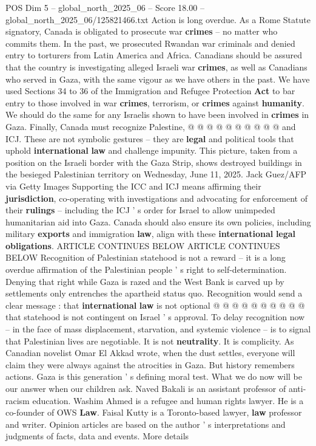 \begin{textsample}{POS Dim 5 – global\_north\_2025\_06 – Score 18.00 – global\_north\_2025\_06/125821466.txt}
Action is long overdue.
As a Rome Statute signatory, Canada is obligated to prosecute war \textbf{crimes} -- no matter who commits them.
In the past, we prosecuted Rwandan war criminals and denied entry to torturers from Latin America and Africa.
Canadians should be assured that the country is investigating alleged Israeli war \textbf{crimes}, as well as Canadians who served in Gaza, with the same vigour as we have others in the past.
We have used Sections 34 to 36 of the Immigration and Refugee Protection \textbf{Act} to bar entry to those involved in war \textbf{crimes}, terrorism, or \textbf{crimes} against \textbf{humanity}.
We should do the same for any Israelis shown to have been involved in \textbf{crimes} in Gaza.
Finally, Canada must recognize Palestine, @ @ @ @ @ @ @ @ @ @ and ICJ.
These are not symbolic gestures -- they are \textbf{legal} and political tools that uphold \textbf{international} \textbf{law} and challenge impunity.
This picture, taken from a position on the Israeli border with the Gaza Strip, shows destroyed buildings in the besieged Palestinian territory on Wednesday, June 11, 2025.
Jack Guez/AFP via Getty Images Supporting the ICC and ICJ means affirming their \textbf{jurisdiction}, co-operating with investigations and advocating for enforcement of their \textbf{rulings} -- including the ICJ ' s order for Israel to allow unimpeded humanitarian aid into Gaza.
Canada should also ensure its own policies, including military \textbf{exports} and immigration \textbf{law}, align with these \textbf{international} \textbf{legal} \textbf{obligations}.
ARTICLE CONTINUES BELOW ARTICLE CONTINUES BELOW Recognition of Palestinian statehood is not a reward -- it is a long overdue affirmation of the Palestinian people ' s right to self-determination.
Denying that right while Gaza is razed and the West Bank is carved up by settlements only entrenches the apartheid status quo.
Recognition would send a clear message : that \textbf{international} \textbf{law} is not optional @ @ @ @ @ @ @ @ @ @ that statehood is not contingent on Israel ' s approval.
To delay recognition now -- in the face of mass displacement, starvation, and systemic violence -- is to signal that Palestinian lives are negotiable.
It is not \textbf{neutrality}.
It is complicity.
As Canadian novelist Omar El Akkad wrote, when the dust settles, everyone will claim they were always against the atrocities in Gaza.
But history remembers actions.
Gaza is this generation ' s defining moral test.
What we do now will be our answer when our children ask.
Naved Bakali is an assistant professor of anti-racism education.
Washim Ahmed is a refugee and human rights lawyer.
He is a co-founder of OWS \textbf{Law}.
Faisal Kutty is a Toronto-based lawyer, \textbf{law} professor and writer.
Opinion articles are based on the author ' s interpretations and judgments of facts, data and events.
More details

\end{textsample}
